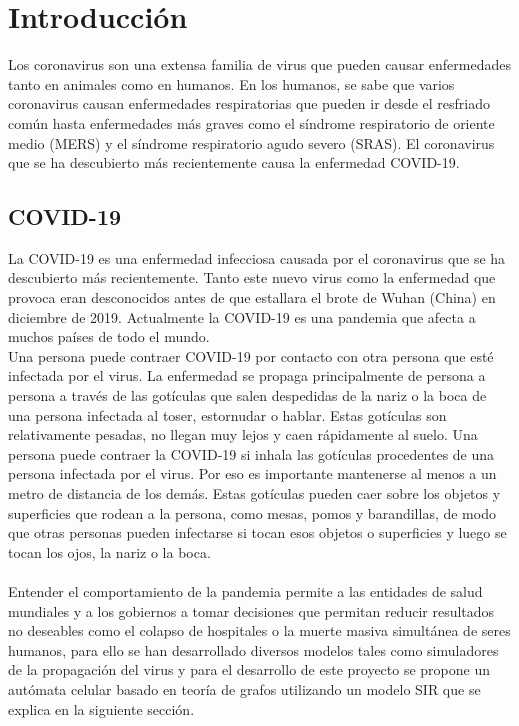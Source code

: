 \chapter{Introducción}
Los coronavirus son una extensa familia de virus que pueden causar enfermedades tanto en animales como en humanos. En los humanos, se sabe que varios coronavirus causan enfermedades respiratorias que pueden ir desde el resfriado común hasta enfermedades más graves como el síndrome respiratorio de oriente medio (MERS) y el síndrome respiratorio agudo severo (SRAS). El coronavirus que se ha descubierto  más recientemente causa la enfermedad COVID-19.
\section{COVID-19}
La COVID-19 es una enfermedad infecciosa causada por el coronavirus que se ha descubierto más recientemente. Tanto este nuevo virus como la enfermedad que provoca eran desconocidos antes de que estallara el brote de Wuhan (China) en diciembre de 2019.
Actualmente la COVID-19 es una pandemia que afecta a muchos países de todo el mundo.
\\
Una persona puede contraer COVID-19 por contacto con otra persona que esté infectada por el virus. La enfermedad se propaga principalmente de persona a persona a través de las gotículas que salen despedidas de la nariz o la boca de una persona infectada al toser, estornudar o hablar. Estas gotículas son relativamente pesadas, no llegan muy lejos y caen rápidamente al suelo. Una persona puede contraer la COVID‑19 si inhala las gotículas procedentes de una persona infectada por el virus. Por eso es importante mantenerse al menos a un metro de distancia de los demás. Estas gotículas pueden caer sobre los objetos y superficies que rodean a la persona, como mesas, pomos y barandillas, de modo que otras personas pueden infectarse si tocan esos objetos o superficies y luego se tocan los ojos, la nariz o la boca. \cite{whoint}\\\\
Entender el comportamiento de la pandemia permite a las entidades de salud mundiales y a los gobiernos a tomar decisiones que permitan reducir resultados no deseables como el colapso de hospitales o la muerte masiva simultánea de seres humanos, para ello se han desarrollado diversos modelos tales como simuladores de la propagación del virus y para el desarrollo de este proyecto se propone un autómata celular basado en teoría de grafos utilizando un modelo SIR que se explica en la siguiente sección. 
